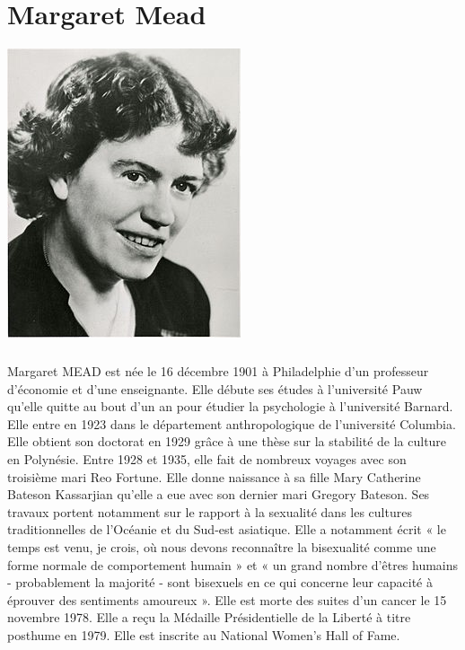 \thispagestyle{plain}

\chapter*{Margaret Mead}

\begin{center}
	\includegraphics[scale=7]{MMead.jpg}
\end{center}

\paragraph{} Margaret MEAD est née le 16 décembre 1901 à Philadelphie d’un
professeur d’économie et d’une enseignante. Elle débute ses études à
l’université Pauw qu’elle quitte au bout d’un an pour étudier la psychologie à
l’université Barnard. Elle entre en 1923 dans le département anthropologique de
l’université Columbia. Elle obtient son doctorat en 1929 grâce à une thèse sur
la stabilité de la culture en Polynésie. Entre 1928 et 1935, elle fait de
nombreux voyages avec son troisième mari Reo Fortune. Elle donne naissance à sa
fille Mary Catherine Bateson Kassarjian qu’elle a eue avec son dernier mari
Gregory Bateson. Ses travaux portent notamment sur le rapport à la sexualité
dans les cultures traditionnelles de l’Océanie et du Sud-est asiatique. Elle a
notamment écrit «  le temps est venu, je crois, où nous devons reconnaître la
bisexualité comme une forme normale de comportement humain » et «  un grand
nombre d'êtres humains - probablement la majorité - sont bisexuels en ce qui
concerne leur capacité à éprouver des sentiments amoureux ». Elle est morte des
suites d’un cancer le 15 novembre 1978. Elle a reçu la Médaille Présidentielle
de la Liberté à titre posthume en 1979. Elle est inscrite au National Women’s
Hall of Fame.
